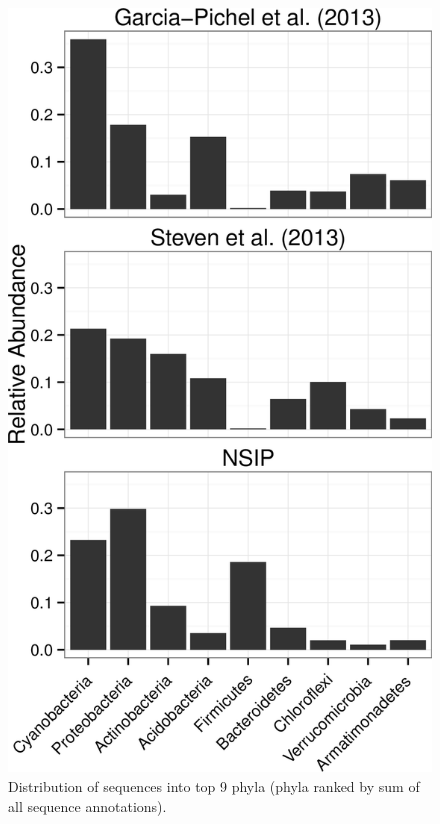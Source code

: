 \begin{figure}[h!]
  \centering
    \includegraphics[width=1.0\textwidth]{figures/study_phylum_dist/study_phylum_dist.png}
  \caption{Distribution of sequences into top 9 phyla (phyla ranked by sum of all sequence annotations).}
  \label{fig:study_phy_dist}
\end{figure}

